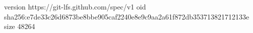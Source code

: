 version https://git-lfs.github.com/spec/v1
oid sha256:e7de33c26d6873be8bbe905caf2240e8e9c9aa2a61f872db353713821712133e
size 48264

